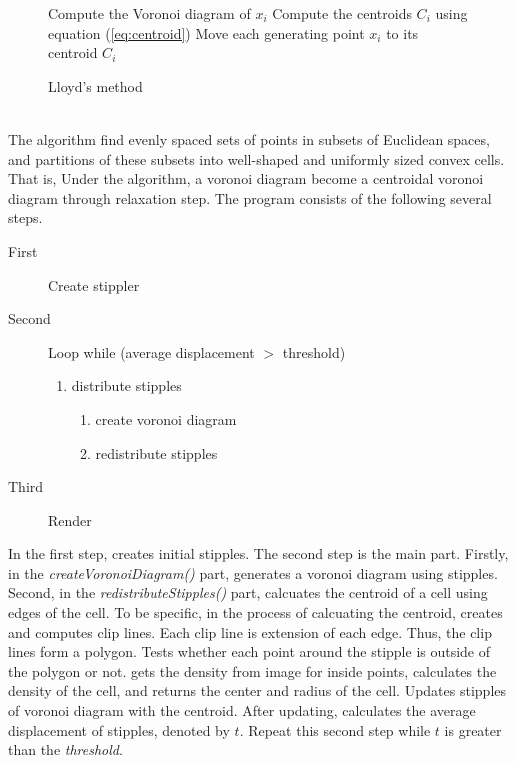 \documentclass[11pt]{article}
\begin{document}
\begin{figure}[hbt]
\centering
\begin{minipage}{0.7\textwidth}

\begin{algorithm}[H]
\caption{Lloyd's method}
\label{lloydmethod}
\begin{algorithmic}
	\State Compute the Voronoi diagram of $x_i$
	\State Compute the centroids $C_i$ using equation (\ref{eq:centroid})
	\State Move each generating point $x_i$ to its centroid $C_i$
\EndWhile
\end{algorithmic}
\end{algorithm}
\end{minipage}
\end{figure}
\\
The algorithm find evenly spaced sets of points in subsets of Euclidean spaces, and partitions of these subsets into well-shaped and uniformly sized convex cells. That is, Under the algorithm, a voronoi diagram become a centroidal voronoi diagram through relaxation step.
\clearpage
The program consists of the following several steps.
\begin{description}
  \item[First] Create stippler
  \item[Second] Loop while (average displacement $>$ threshold)
	\begin{enumerate}
	  \item distribute stipples
		\begin{enumerate}
	     \item create voronoi diagram	
	     \item redistribute stipples
		\end{enumerate}
	\end{enumerate}
  \item[Third] Render
\end{description}

In the first step, creates initial stipples. The second step is the main part. Firstly, in the \textit{createVoronoiDiagram()} part, generates a voronoi diagram using stipples. Second, in the \textit{redistributeStipples()} part, calcuates the centroid of a cell using edges of the cell. To be specific, in the process of calcuating the centroid, creates and computes clip lines. Each clip line is extension of each edge. Thus, the clip lines form a polygon. Tests whether each point around the stipple is outside of the polygon or not. gets the density from image for inside points, calculates the density of the cell, and returns the center and radius of the cell. Updates stipples of voronoi diagram with the centroid. After updating, calculates the average displacement of stipples, denoted by $t$. Repeat this second step while $t$ is greater than the \textit{threshold}.
\end{document}
